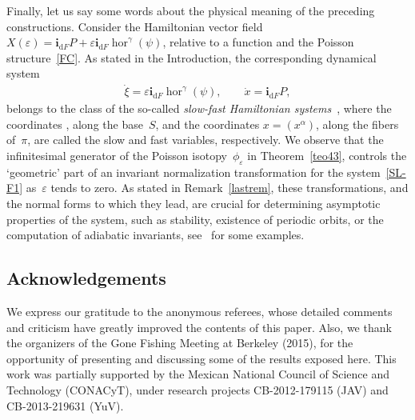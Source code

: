 \documentclass[pdftex]{sigma}
\numberwithin{equation}{section}
\begin{document}
Finally, let us say some words about the physical meaning of the preceding constructions. Consider the Hamiltonian vector f\/ield
$X(\varepsilon)=\mathbf{i}_{\mathrm{d}F}P+\varepsilon\mathbf{i}_{\mathrm{d}F} \operatorname{hor}^{\gamma}(\psi)$, relative
to a function  and the Poisson structure~\eqref{FC}. As stated in the Introduction, the corresponding dynamical system
\begin{gather}\label{SL-F1}
\dot{\xi}=\varepsilon\mathbf{i}_{\mathrm{d}F}\operatorname{hor}^{\gamma}(\psi),\qquad \dot{x}=\mathbf{i}_{\mathrm{d}F}P,
\end{gather}
belongs to the class of the so-called \emph{slow-fast Hamiltonian systems}~\cite{ArKN-88}, where the coordinates , along the base~$S$, and the coordinates $x=(x^{\alpha})$, along the f\/ibers of~$\pi$, are called the slow and fast variables, respectively. We observe that the inf\/initesimal generator of the Poisson isotopy~$\phi_{\varepsilon}$ in Theorem~\ref{teo43}, controls the `geometric' part of an invariant normalization transformation for the system~\eqref{SL-F1} as~$\varepsilon$ tends to zero. As stated in Remark~\ref{lastrem}, these transformations, and the normal forms to which they lead, are crucial for determining asymptotic properties of the system, such as stability, existence of periodic orbits, or the computation of adiabatic invariants, see~\cite{MJYu-13} for some examples.

\subsection*{Acknowledgements}

We express our gratitude to the anonymous referees, whose detailed comments and criticism have greatly improved the contents of this paper. Also, we thank the organizers of the Gone Fishing Meeting at Berkeley (2015), for the opportunity of presenting and discussing some of the results exposed here. This work was partially supported by the Mexican National Council of Science and Technology (CONACyT), under research projects CB-2012-179115 (JAV) and CB-2013-219631 (YuV).
\end{document}
